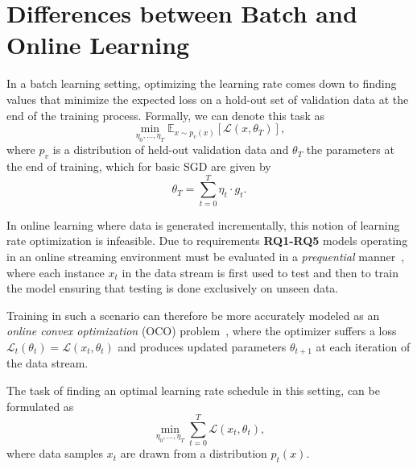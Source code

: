 \documentclass[letterpaper]{article} %
\begin{document}
\section{Differences between Batch and Online Learning}\label{sec:diffs_batch_online}

In a batch learning setting, optimizing the learning rate comes down to finding values that minimize the expected loss on a hold-out set of validation data at the end of the training process.
Formally, we can denote this task as
\begin{equation}
	\label{eq:batch_lr_optim}
	\min_{\eta_0, \ldots, \eta_T} \mathbb{E}_{x \sim p_v(x)}[\mathcal{L}(x, \theta_T)],
\end{equation}
where $p_v$ is a distribution of held-out validation data and $\theta_T$ the parameters at the end of training, which for basic SGD are given by
\begin{equation}
	\theta_T = \sum_{t=0}^{T} \eta_t \cdot g_t.
\end{equation}

In online learning where data is generated incrementally, this notion of learning rate optimization is infeasible.
Due to requirements \textbf{RQ1-RQ5} models operating in an online streaming environment must be evaluated in a \textit{prequential} manner~\cite{bifetMOAMassiveOnline2010}, where each instance $x_t$ in the data stream is first used to test and then to train the model ensuring that testing is done exclusively on unseen data.

Training in such a scenario can therefore be more accurately modeled as an \textit{online convex optimization} (OCO) problem~\cite{shalev-shwartzOnlineLearningOnline2011,hazanIntroductionOnlineConvex2016}, where the optimizer suffers a loss $\mathcal{L}_t(\theta_t) = \mathcal{L}(x_t, \theta_{t})$ and produces updated parameters $\theta_{t+1}$ at each iteration of the data stream.

The task of finding an optimal learning rate schedule in this setting, can be formulated as
\begin{equation}
	\label{eq:stream_lr_optim}
	\min_{\eta_0, \ldots, \eta_T} \sum_{t=0}^{T} \mathcal{L}(x_t, \theta_t),
\end{equation}
where data samples $x_t$ are drawn from a distribution $p_t(x)$.
\end{document}

